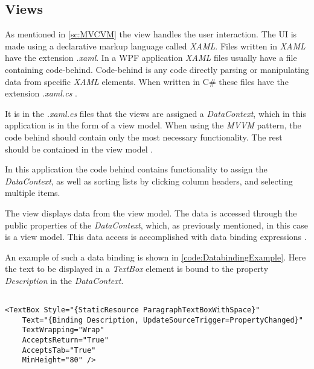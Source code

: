 \subsection{Views} \label{ssc:Views}
As mentioned in \autoref{sc:MVCVM} the view handles the user interaction. The UI is made using a declarative markup language called \textit{XAML}. Files written in \textit{XAML} have the extension \textit{.xaml}. In a WPF application \textit{XAML} files usually have a file containing code-behind. Code-behind is any code directly parsing or manipulating data from specific \textit{XAML} elements. When written in C\# these files have the extension \textit{.xaml.cs} \citep{XamlOverview}.
\par

It is in the \textit{.xaml.cs} files that the views are assigned a \textit{DataContext}, which in this application is in the form of a view model.
When using the \textit{MVVM} pattern, the code behind should contain only the most necessary functionality. The rest should be contained in the view model \citep{WPFandMVVM}.
\par

In this application the code behind contains functionality to assign the \textit{DataContext}, as well as sorting lists by clicking column headers, and selecting multiple items.


\par

The view displays data from the view model. The data is accessed through the public properties of the \textit{DataContext}, which, as previously mentioned, in this case is a view model. This data access is accomplished with data binding expressions \citep{Bindings}.
\par
An example of such a data binding is shown in \autoref{code:DatabindingExample}. Here the text to be displayed in a \textit{TextBox} element is bound to the property \textit{Description} in the \textit{DataContext}.

\begin{listing}[H]
\begin{verbatim}

<TextBox Style="{StaticResource ParagraphTextBoxWithSpace}"
    Text="{Binding Description, UpdateSourceTrigger=PropertyChanged}"
    TextWrapping="Wrap"
    AcceptsReturn="True"
    AcceptsTab="True"
    MinHeight="80" />

\end{verbatim}
\label{code:DatabindingExample}
\end{listing}
\par

